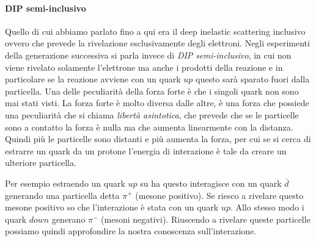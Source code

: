 \paragraph{DIP semi-inclusivo}
Quello di cui abbiamo parlato fino a qui era il deep inelastic scattering inclusivo ovvero che prevede la rivelazione esclusivamente degli elettroni.
Negli esperimenti della generazione successiva si parla invece di \emph{DIP semi-inclusivo}, in cui non viene rivelato solamente l'elettrone ma anche i prodotti della reazione e in particolare se la reazione avviene con un quark $up$ questo sarà sparato fuori dalla particella.
Una delle peculiarità della forza forte è che i singoli quark non sono mai stati visti.
La forza forte è molto diversa dalle altre, è una forza che possiede una peculiarità che si chiama \emph{libertà asintotica}, che prevede che se le particelle sono a contatto la forza è nulla ma che aumenta linearmente con la distanza.
Quindi più le particelle sono distanti e più aumenta la forza, per cui se si cerca di estrarre un quark da un protone l'energia di interazione è tale da creare un ulteriore particella.

Per esempio estraendo un quark $up$ su ha questo interagisce con un quark $\bar{d}$ generando una particella detta $\pi^+$ (mesone positivo).
Se riesco a rivelare questo mesone positivo so che l'interazione è stata con un quark $up$.
Allo stesso modo i quark $down$ generano $\pi^-$ (mesoni negativi).
Riuscendo a rivelare queste particelle possiamo quindi approfondire la nostra conoscenza sull'interazione.


